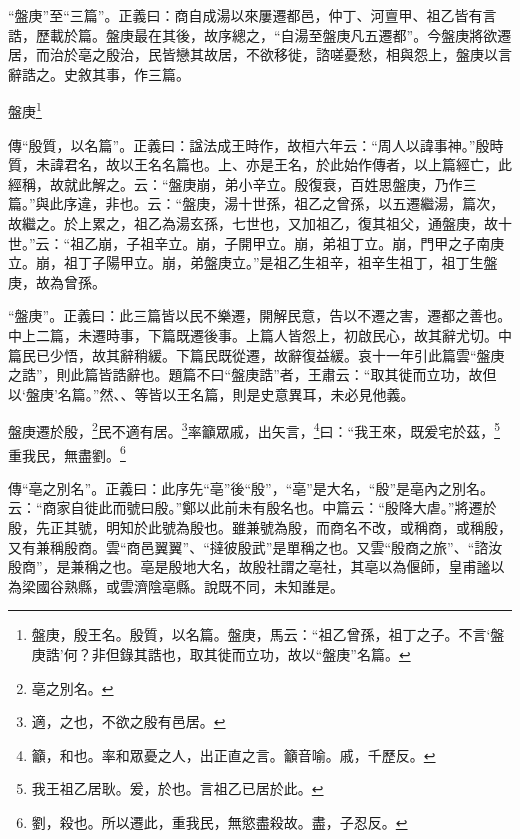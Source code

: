 {\noindent\shu{}\fzkt “盤庚”至“三篇”。正義曰：商自成湯以來屢遷都邑，仲丁、河亶甲、祖乙皆有言誥，歷載於篇。盤庚最在其後，故序總之，“自湯至盤庚凡五遷都”。今盤庚將欲遷居，而治於亳之殷治，民皆戀其故居，不欲移徙，諮嗟憂愁，相與怨上，盤庚以言辭誥之。史敘其事，作三篇。 \par}

盤庚\footnote{盤庚，殷王名。殷質，以名篇。盤庚，馬云：“祖乙曾孫，祖丁之子。不言‘盤庚誥’何？非但錄其誥也，取其徙而立功，故以“盤庚”名篇。}


{\noindent\zhuan{}\fzbyks 傳“殷質，以名篇”。正義曰：諡法成王時作，故桓六年云：“周人以諱事神。”殷時質，未諱君名，故以王名名篇也。上、亦是王名，於此始作傳者，以上篇經亡，此經稱，故就此解之。云：“盤庚崩，弟小辛立。殷復衰，百姓思盤庚，乃作三篇。”與此序違，非也。云：“盤庚，湯十世孫，祖乙之曾孫，以五遷繼湯，篇次，故繼之。於上累之，祖乙為湯玄孫，七世也，又加祖乙，復其祖父，通盤庚，故十世。”云：“祖乙崩，子祖辛立。崩，子開甲立。崩，弟祖丁立。崩，門甲之子南庚立。崩，祖丁子陽甲立。崩，弟盤庚立。”是祖乙生祖辛，祖辛生祖丁，祖丁生盤庚，故為曾孫。 \par}

{\noindent\shu{}\fzkt “盤庚”。正義曰：此三篇皆以民不樂遷，開解民意，告以不遷之害，遷都之善也。中上二篇，未遷時事，下篇既遷後事。上篇人皆怨上，初啟民心，故其辭尤切。中篇民已少悟，故其辭稍緩。下篇民既從遷，故辭復益緩。哀十一年引此篇雲“盤庚之誥”，則此篇皆誥辭也。題篇不曰“盤庚誥”者，王肅云：“取其徙而立功，故但以‘盤庚’名篇。”然、、等皆以王名篇，則是史意異耳，未必見他義。 \par}

盤庚遷於殷，\footnote{亳之別名。}民不適有居。\footnote{適，之也，不欲之殷有邑居。}率籲眾戚，出矢言，\footnote{籲，和也。率和眾憂之人，出正直之言。籲音喻。戚，千歷反。}曰：“我王來，既爰宅於茲，\footnote{我王祖乙居耿。爰，於也。言祖乙已居於此。}重我民，無盡劉。\footnote{劉，殺也。所以遷此，重我民，無慾盡殺故。盡，子忍反。}



{\noindent\zhuan{}\fzbyks 傳“亳之別名”。正義曰：此序先“亳”後“殷”，“亳”是大名，“殷”是亳內之別名。云：“商家自徙此而號曰殷。”鄭以此前未有殷名也。中篇云：“殷降大虐。”將遷於殷，先正其號，明知於此號為殷也。雖兼號為殷，而商名不改，或稱商，或稱殷，又有兼稱殷商。雲“商邑翼翼”、“撻彼殷武”是單稱之也。又雲“殷商之旅”、“諮汝殷商”，是兼稱之也。亳是殷地大名，故殷社謂之亳社，其亳以為偃師，皇甫謐以為梁國谷熟縣，或雲濟陰亳縣。說既不同，未知誰是。 \par}

